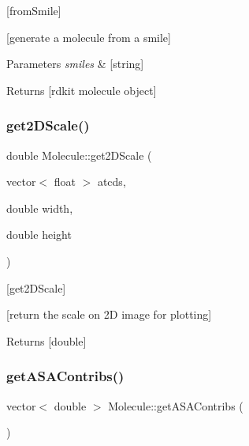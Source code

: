 \mbox{[}from\+Smile\mbox{]} 

\mbox{[}generate a molecule from a smile\mbox{]}


\begin{DoxyParams}{Parameters}
{\em smiles} & \mbox{[}string\mbox{]} \\
\hline
\end{DoxyParams}
\begin{DoxyReturn}{Returns}
\mbox{[}rdkit molecule object\mbox{]} 
\end{DoxyReturn}
\mbox{\label{class_molecule_ac36056d9d2c1f09d25f70abdd88e7233}} 
\subsubsection{\texorpdfstring{get2\+D\+Scale()}{get2DScale()}}
{\footnotesize\ttfamily double Molecule\+::get2\+D\+Scale (\begin{DoxyParamCaption}\item[{vector$<$ float $>$}]{atcds,  }\item[{double}]{width,  }\item[{double}]{height }\end{DoxyParamCaption})}



\mbox{[}get2\+D\+Scale\mbox{]} 

\mbox{[}return the scale on 2D image for plotting\mbox{]}

\begin{DoxyReturn}{Returns}
\mbox{[}double\mbox{]} 
\end{DoxyReturn}
\mbox{\label{class_molecule_a6788d32036ced74e382310e93629b785}} 
\subsubsection{\texorpdfstring{get\+A\+S\+A\+Contribs()}{getASAContribs()}}
{\footnotesize\ttfamily vector$<$ double $>$ Molecule\+::get\+A\+S\+A\+Contribs (\begin{DoxyParamCaption}{ }\end{DoxyParamCaption})}



